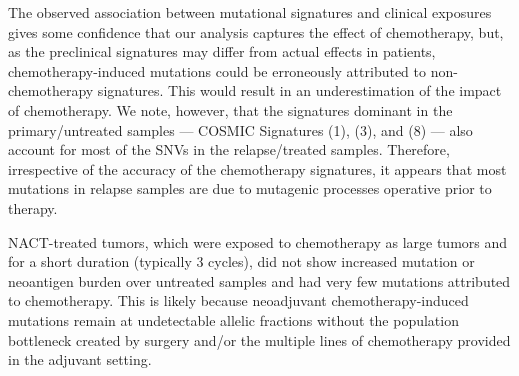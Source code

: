 The observed association between mutational signatures and clinical exposures gives some confidence that our analysis captures the effect of chemotherapy, but, as the preclinical signatures may differ from actual effects in patients, chemotherapy-induced mutations could be erroneously attributed to non-chemotherapy signatures. This would result in an underestimation of the impact of chemotherapy. We note, however, that the signatures dominant in the primary/untreated samples --- COSMIC Signatures (1), (3), and (8) --- also account for most of the SNVs in the relapse/treated samples. Therefore, irrespective of the accuracy of the chemotherapy signatures, it appears that most mutations in relapse samples are due to mutagenic processes operative prior to therapy.




NACT-treated tumors, which were exposed to chemotherapy as large tumors and for a short duration (typically 3 cycles), did not show increased mutation or neoantigen burden over untreated samples and had very few mutations attributed to chemotherapy. This is likely because neoadjuvant chemotherapy-induced mutations remain at undetectable allelic fractions without the population bottleneck created by surgery and/or the multiple lines of chemotherapy provided in the adjuvant setting.


